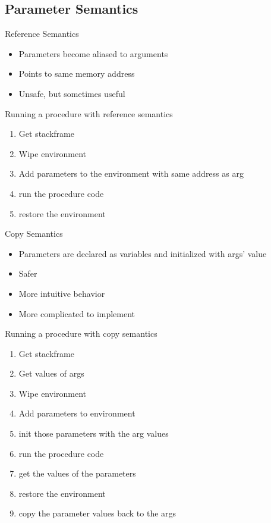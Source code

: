 \subsection*{Parameter Semantics}
\begin{frame}{Reference Semantics}
    \begin{itemize}
        \item Parameters become aliased to arguments 
        \item Points to same memory address
        \item Unsafe, but sometimes useful
    \end{itemize}
\end{frame}
\begin{frame}{Running a procedure with reference semantics}
    \begin{enumerate}
        \item Get stackframe
        \item Wipe environment
        \item Add parameters to the environment with same address as arg
        \item run the procedure code
        \item restore the environment
    \end{enumerate}
\end{frame}
\begin{frame}{Copy Semantics}
    \begin{itemize}
        \item Parameters are declared as variables and initialized with args' value
        \item Safer
        \item More intuitive behavior
        \item More complicated to implement
    \end{itemize}
\end{frame}

\begin{frame}{Running a procedure with copy semantics}
    \begin{enumerate}
        \item Get stackframe
        \item Get values of args
        \item Wipe environment
        \item Add parameters to environment
        \item init those parameters with the arg values
        \item run the procedure code
        \item get the values of the parameters
        \item restore the environment
        \item copy the parameter values back to the args
    \end{enumerate}
\end{frame}


